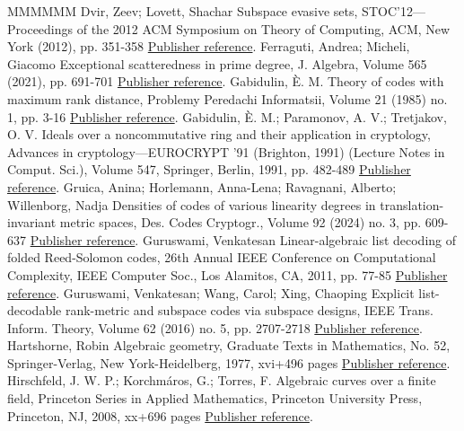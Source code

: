 \begin{thebibliography}{MMMMMM}
 Dvir, Zeev; Lovett, Shachar Subspace evasive sets, STOC’12—Proceedings of the 2012 ACM Symposium on Theory of Computing, ACM, New York (2012), pp. 351-358 \href{https://alco.centre-mersenne.org/articles/10.5802/alco.377/#dvir2012subspace}{Publisher reference}.
 Ferraguti, Andrea; Micheli, Giacomo Exceptional scatteredness in prime degree, J. Algebra, Volume 565 (2021), pp. 691-701 \href{https://alco.centre-mersenne.org/articles/10.5802/alco.377/#MR4163074}{Publisher reference}.
 Gabidulin, È. M. Theory of codes with maximum rank distance, Problemy Peredachi Informatsii, Volume 21 (1985) no. 1, pp. 3-16 \href{https://alco.centre-mersenne.org/articles/10.5802/alco.377/#gabidulin1985theory}{Publisher reference}.
 Gabidulin, È. M.; Paramonov, A. V.; Tretjakov, O. V. Ideals over a noncommutative ring and their application in cryptology, Advances in cryptology—EUROCRYPT ’91 (Brighton, 1991) (Lecture Notes in Comput. Sci.), Volume 547, Springer, Berlin, 1991, pp. 482-489 \href{https://alco.centre-mersenne.org/articles/10.5802/alco.377/#gabidulin1991ideals}{Publisher reference}.
 Gruica, Anina; Horlemann, Anna-Lena; Ravagnani, Alberto; Willenborg, Nadja Densities of codes of various linearity degrees in translation-invariant metric spaces, Des. Codes Cryptogr., Volume 92 (2024) no. 3, pp. 609-637 \href{https://alco.centre-mersenne.org/articles/10.5802/alco.377/#gruica2024densities}{Publisher reference}.
 Guruswami, Venkatesan Linear-algebraic list decoding of folded Reed-Solomon codes, 26th Annual IEEE Conference on Computational Complexity, IEEE Computer Soc., Los Alamitos, CA, 2011, pp. 77-85 \href{https://alco.centre-mersenne.org/articles/10.5802/alco.377/#guruswami2011linear}{Publisher reference}.
 Guruswami, Venkatesan; Wang, Carol; Xing, Chaoping Explicit list-decodable rank-metric and subspace codes via subspace designs, IEEE Trans. Inform. Theory, Volume 62 (2016) no. 5, pp. 2707-2718 \href{https://alco.centre-mersenne.org/articles/10.5802/alco.377/#guruswami2016explicit}{Publisher reference}.
 Hartshorne, Robin Algebraic geometry, Graduate Texts in Mathematics, No. 52, Springer-Verlag, New York-Heidelberg, 1977, xvi+496 pages \href{https://alco.centre-mersenne.org/articles/10.5802/alco.377/#Hartshorne}{Publisher reference}.
 Hirschfeld, J. W. P.; Korchmáros, G.; Torres, F. Algebraic curves over a finite field, Princeton Series in Applied Mathematics, Princeton University Press, Princeton, NJ, 2008, xx+696 pages \href{https://alco.centre-mersenne.org/articles/10.5802/alco.377/#HKT}{Publisher reference}.

\end{thebibliography}
